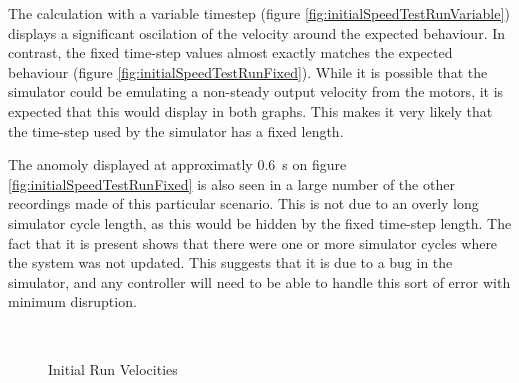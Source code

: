 \documentclass[10pt]{article} \usepackage[a4paper]{geometry}
\begin{document}
The calculation with a variable timestep (figure
\ref{fig:initialSpeedTestRunVariable}) displays a significant oscilation of the
velocity around the expected behaviour.  In contrast, the fixed time-step values
almost exactly matches the expected behaviour (figure
\ref{fig:initialSpeedTestRunFixed}).  While it is possible that the simulator
could be emulating a non-steady output velocity from the motors, it is expected
that this would display in both graphs.  This makes it very likely that the
time-step used by the simulator has a fixed length.

The anomoly displayed at approximatly \SI{0.6}{\second} on figure
\ref{fig:initialSpeedTestRunFixed} is also seen in a large number of the other
recordings made of this particular scenario.  This is not due to an overly long
simulator cycle length, as this would be hidden by the fixed time-step length. 
The fact that it is present shows that there were one or more simulator cycles
where the system was not updated.  This suggests that it is due to a bug in the
simulator, and any controller will need to be able to handle this sort of error
with minimum disruption.

\begin{figure}
 \centering
 \\
 \caption{Initial Run Velocities}
 \label{fig:initialSpeedTestRun}
\end{figure}
 
\end{document}
